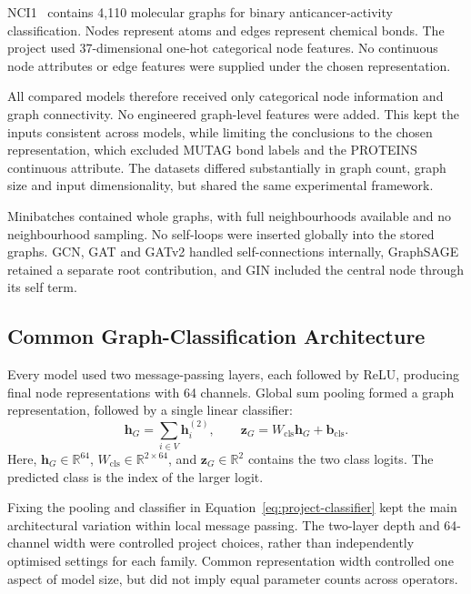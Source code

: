 \documentclass[11pt,a4paper]{article}
\begin{document}
NCI1~\cite{wale2008comparison} contains 4,110 molecular graphs for binary anticancer-activity classification. Nodes represent atoms and edges represent chemical bonds. The project used 37-dimensional one-hot categorical node features. No continuous node attributes or edge features were supplied under the chosen representation.

All compared models therefore received only categorical node information and graph connectivity. No engineered graph-level features were added. This kept the inputs consistent across models, while limiting the conclusions to the chosen representation, which excluded MUTAG bond labels and the PROTEINS continuous attribute. The datasets differed substantially in graph count, graph size and input dimensionality, but shared the same experimental framework.

Minibatches contained whole graphs, with full neighbourhoods available and no neighbourhood sampling. No self-loops were inserted globally into the stored graphs. GCN, GAT and GATv2 handled self-connections internally, GraphSAGE retained a separate root contribution, and GIN included the central node through its self term.

\subsection{Common Graph-Classification Architecture}
\label{sec:common-architecture}

Every model used two message-passing layers, each followed by ReLU, producing final node representations with 64 channels. Global sum pooling formed a graph representation, followed by a single linear classifier:
\begin{equation}
\mathbf{h}_G=\sum_{i\in V}\mathbf{h}_i^{(2)},
\qquad
\mathbf{z}_G=W_{\mathrm{cls}}\mathbf{h}_G+\mathbf{b}_{\mathrm{cls}}.
\label{eq:project-classifier}
\end{equation}
Here, \(\mathbf{h}_G\in\mathbb{R}^{64}\), \(W_{\mathrm{cls}}\in\mathbb{R}^{2\times64}\), and \(\mathbf{z}_G\in\mathbb{R}^{2}\) contains the two class logits. The predicted class is the index of the larger logit.

Fixing the pooling and classifier in Equation~\eqref{eq:project-classifier} kept the main architectural variation within local message passing. The two-layer depth and 64-channel width were controlled project choices, rather than independently optimised settings for each family. Common representation width controlled one aspect of model size, but did not imply equal parameter counts across operators.
\end{document}
